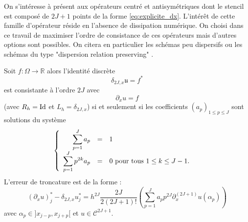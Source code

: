 On s'intéresse à présent aux opérateurs centré et antisymétriques dont le stencil est composé de $2J+1$ points de la forme \eqref{eq:explicite_dx}. L'intérêt de cette famille d'opérateur réside en l'absence de dissipation numérique. On choisi dans ce travail de maximiser l'ordre de consistance de ces opérateurs mais d'autres options sont possibles. On citera en particulier les schémas peu dispersifs \cite{Bogey2004} ou les schémas du type "dispersion relation preserving" \cite{Tam1993}.

\begin{theoreme}
Soit $f : \Omega \rightarrow \mathbb{R}$ alors l'identité discrète
\begin{equation}
\delta_{2J,x} \mathfrak{u} = f^*
\end{equation}
est consistante à l'ordre $2J$ avec 
\begin{equation}
\partial_x u = f
\end{equation}
(avec $R_h = \text{Id}$ et $L_h = \delta_{2J,x}$) si et seulement si les coefficients $(a_p)_{1 \leq p \leq J}$ sont solutions du système
\begin{equation}
\left\lbrace
\begin{array}{rcll}
\displaystyle\sum\limits_{p=1}^J a_p & = & 1 & \\
\displaystyle\sum\limits_{p=1}^J p^{2k} a_p & = & 0 \text{ pour tous } 1 \leq k \leq J-1.
\end{array}
\right.
\label{eq:syst_opexplicite_P}
\end{equation}
L'erreur de troncature est de la forme :
\begin{equation}
\left(\partial_x u \right)_j^* - \delta_{2J,x} u^*_j = h^{2J}  \dfrac{2J}{2(2J+1)!}   \left(  \sum_{p=1}^J a_p p^{2J} \partial^{(2J+1)}_x u(\alpha_p) \right)
\end{equation} 
avec $\alpha_p \in ]x_{j-p}, x_{j+p}[$ et $u \in \mathcal{C}^{2J+1}$.
\label{th:consistance_delta_x_explicite}
\end{theoreme}


